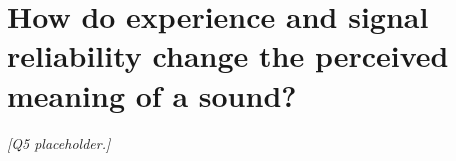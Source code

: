 \section{How do experience and signal reliability change the perceived meaning of a sound?}
\label{sec:q5}


\textit{[Q5 placeholder.]}
